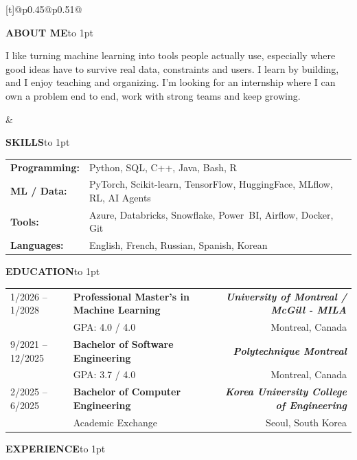 \documentclass[a4paper,10pt]{article}
\newcommand{\sechead}[1]{\vspace{0.5em}\noindent\textbf{\large #1}\hspace{0.8em}\leaders\hbox to 1pt{\hss\raisebox{0.3em}{\rule{1pt}{0.4pt}}\hss}\hfill\null\par\vspace{0.45em}}
\begin{document}
\noindent
\begin{tabularx}{\textwidth}[t]{@{}p{0.45\textwidth}@{\hspace{2em}}p{0.51\textwidth}@{}}
  \parbox[t]{\linewidth}{
    \sechead{ABOUT ME}
        I like turning machine learning into tools people actually use, especially where good ideas have to survive real data, constraints and users. I learn by building, and I enjoy teaching and organizing. I'm looking for an internship where I can own a problem end to end, work with strong teams and keep growing.
  }
  &
  \parbox[t]{\linewidth}{
    \sechead{SKILLS}
    \begin{tabular}{@{}p{2.5cm}>{\raggedright\arraybackslash}p{\dimexpr\linewidth-3.2cm}@{}}
      \textbf{Programming:} & Python, SQL, C++, Java, Bash, R \\[0.2em]
      \textbf{ML / Data:} & PyTorch, Scikit-learn, TensorFlow, \mbox{HuggingFace}, MLflow, RL, AI Agents \\[0.2em]
      \textbf{Tools:} & Azure, Databricks, Snowflake, \mbox{Power BI}, \mbox{Airflow}, Docker, Git \\
      \textbf{Languages:} & English, French, Russian, Spanish, \mbox{Korean}
    \end{tabular}
  }
\end{tabularx}

\vspace{0.2em}
\sechead{EDUCATION}

\begin{tabularx}{\textwidth}{@{}p{3cm} X r@{}}
    1/2026 -- 1/2028 & 
    \textbf{Professional Master's in Machine Learning} 
    & \textbf{\textit{University of Montreal / McGill  - MILA}} \\ 
    & GPA: 4.0 / 4.0 & 
    Montreal, Canada \\[0.2em]
    
    9/2021 -- 12/2025 & \textbf{Bachelor of Software Engineering} & \textbf{\textit{Polytechnique Montreal}} \\
    & GPA: 3.7 / 4.0 & Montreal, Canada \\[0.2em]
    
    2/2025 -- 6/2025 & \textbf{Bachelor of Computer Engineering} & \textbf{\textit{Korea University College of Engineering}} \\
    & Academic Exchange & Seoul, South Korea
\end{tabularx}

\vspace{0.2em}
\sechead{EXPERIENCE}
\end{document}
